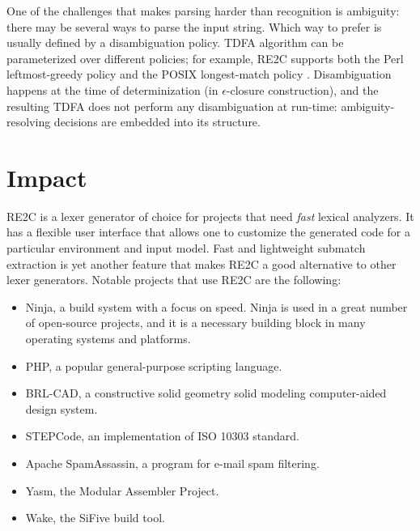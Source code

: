 \documentclass[preprint,12pt, a4paper]{elsarticle}
\begin{document}
\noindent
One of the challenges that makes parsing harder than recognition is ambiguity:
there may be several ways to parse the input string.
Which way to prefer is usually defined by a disambiguation policy.
TDFA algorithm can be parameterized over different policies;
for example, RE2C supports both the Perl leftmost-greedy policy and the POSIX longest-match policy \cite{BorTro19}.
Disambiguation happens at the time of determinization (in $\epsilon$-closure construction),
and the resulting TDFA does not perform any disambiguation at run-time: ambiguity-resolving decisions are embedded into its structure.

\section{Impact}

\noindent
RE2C is a lexer generator of choice for projects that need \emph{fast} lexical analyzers.
It has a flexible user interface that allows one to customize the generated code for a particular environment and input model.
Fast and lightweight submatch extraction is yet another feature that makes RE2C a good alternative to other lexer generators.
Notable projects that use RE2C are the following:

\begin{itemize}
\item Ninja, a build system with a focus on speed. \cite{Ninja}
    Ninja is used in a great number of open-source projects,
    and it is a necessary building block in many operating systems and platforms.

\item PHP, a popular general-purpose scripting language. \cite{PHP}

\item BRL-CAD, a constructive solid geometry solid modeling computer-aided design system. \cite{BRLCAD}

\item STEPCode, an implementation of ISO 10303 standard. \cite{STEPCode}

\item Apache SpamAssassin, a program for e-mail spam filtering. \cite{SpamAssassin}

\item Yasm, the Modular Assembler Project. \cite{Yasm}

\item Wake, the SiFive build tool. \cite{Wake}
\end{itemize}
\end{document}

